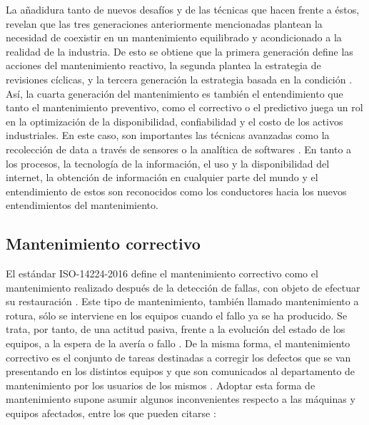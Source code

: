La añadidura tanto de nuevos desafíos y de las técnicas que hacen frente a éstos, revelan que  las tres generaciones anteriormente mencionadas plantean la necesidad de coexistir en un mantenimiento equilibrado y acondicionado a la realidad de la industria. De esto se obtiene que la primera generación define las acciones del mantenimiento reactivo, la segunda plantea la estrategia de revisiones cíclicas, y la tercera generación la estrategia basada en la condición \citep{hide2013}.
Así, la cuarta generación del mantenimiento es también el entendimiento que tanto el mantenimiento preventivo, como el correctivo o el predictivo juega un rol en la optimización de la disponibilidad, confiabilidad y el costo de los activos industriales. En este caso, son importantes las técnicas avanzadas como la recolección de data a través de sensores o la analítica de softwares \citep{houle2016}.
En tanto a los procesos, la tecnología de la información, el uso y la disponibilidad del internet, la obtención de información en cualquier parte del mundo y el entendimiento de estos son reconocidos como los conductores hacia los nuevos entendimientos del mantenimiento.


\subsection{Mantenimiento correctivo}

El estándar ISO-14224-2016 define el mantenimiento correctivo como el mantenimiento realizado después de la detección de fallas, con objeto de efectuar su restauración \citep{iso2016}. Este tipo de mantenimiento, también llamado mantenimiento a rotura, sólo se interviene en los equipos cuando el fallo ya se ha producido. Se trata, por tanto, de una actitud pasiva, frente a la evolución del estado de los equipos, a la espera de la avería o fallo \citep{gomez1998}. De la misma forma, el mantenimiento correctivo es el conjunto de tareas destinadas a corregir los defectos que se van presentando en los distintos equipos y que son comunicados al departamento de mantenimiento por los usuarios de los mismos \citep{garcia2010}.
Adoptar esta forma de mantenimiento supone asumir algunos inconvenientes respecto a las máquinas y equipos afectados, entre los que pueden citarse \citep{gomez1998}:\\

